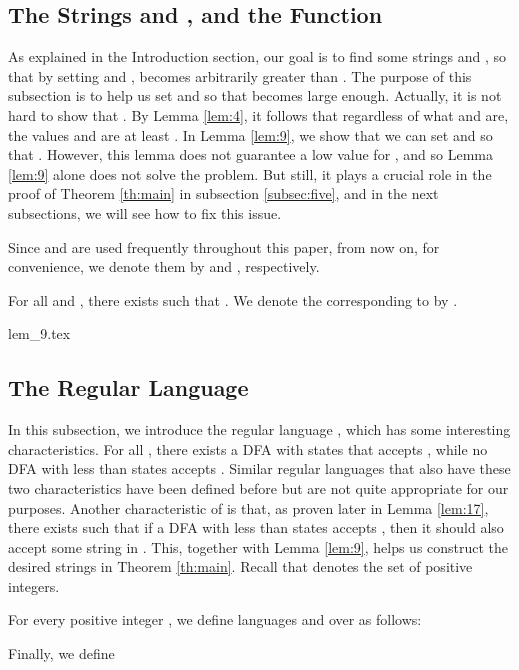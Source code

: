\documentclass[preprint, 12pt]{elsarticle}
\begin{document}
	\subsection{The Strings  and , and the Function }	
	\label{subsec:two}
	As explained in the Introduction section, our goal is to find some strings  and , so that by setting  and ,  becomes arbitrarily greater than . The purpose of this subsection is to help us set  and  so that  becomes large enough. Actually, it is not hard to show that . By Lemma \ref{lem:4}, it follows that regardless of what  and  are, the values  and  are at least . In Lemma \ref{lem:9}, we show that we can set  and  so that . However, this lemma does not guarantee a low value for , and so Lemma \ref{lem:9} alone does not solve the problem. But still, it plays a crucial role in the proof of Theorem \ref{th:main} in subsection \ref{subsec:five}, and in the next subsections, we will see how to fix this issue.

\begin{definition}
	Since  and  are used frequently throughout this paper, from now on, for convenience, we denote them by  and , respectively.
\end{definition}

	
	\begin{lemma}
		\label{lem:9}
		For all  and , there exists  such that . We denote the  corresponding to  by .
	\end{lemma}
	{lem_9.tex}
	
	
	\subsection{The Regular Language }
	\label{subsec:three}
	In this subsection, we introduce the regular language , which has some interesting characteristics. For all ,
	there exists a DFA with  states that accepts , while no DFA with less than  states accepts . 
	Similar regular languages that also have these two characteristics
 	have been defined before \cite{reverseGaoKY12a, reverseJiraskova08, reverseSebej10} but are not quite appropriate for our purposes. Another characteristic of  is that, as proven later in Lemma \ref{lem:17}, there exists  such that if a DFA with less than  states accepts , then it should also accept some string in . This, together with Lemma \ref{lem:9}, helps us construct the desired strings in Theorem \ref{th:main}. Recall that  denotes the set of positive integers.

	\begin{definition}
		 For every positive integer , we define languages  and  over  as follows:
		
		Finally, we define 
	\end{definition}
	
\end{document}
